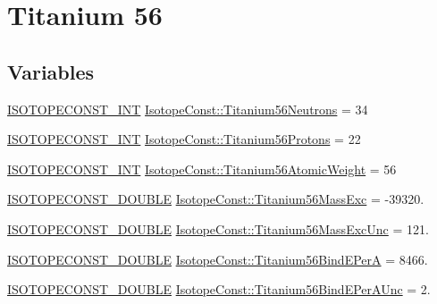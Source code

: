 \hypertarget{group___isotope_const-_titanium-_ti56}{}\section{Titanium 56}
\label{group___isotope_const-_titanium-_ti56}
\subsection*{Variables}
\begin{DoxyCompactItemize}
\item 
\mbox{\hyperlink{group___isotope_const-_macros_ga5f18360b3e99483a35c32d789e62621c}{I\+S\+O\+T\+O\+P\+E\+C\+O\+N\+S\+T\+\_\+\+I\+NT}} \mbox{\hyperlink{group___isotope_const-_titanium-_ti56_ga70e68827f6d0f960cc6df82e3f861377}{Isotope\+Const\+::\+Titanium56\+Neutrons}} = 34
\item 
\mbox{\hyperlink{group___isotope_const-_macros_ga5f18360b3e99483a35c32d789e62621c}{I\+S\+O\+T\+O\+P\+E\+C\+O\+N\+S\+T\+\_\+\+I\+NT}} \mbox{\hyperlink{group___isotope_const-_titanium-_ti56_ga25c76c976bf1a2342878a7973c083ddc}{Isotope\+Const\+::\+Titanium56\+Protons}} = 22
\item 
\mbox{\hyperlink{group___isotope_const-_macros_ga5f18360b3e99483a35c32d789e62621c}{I\+S\+O\+T\+O\+P\+E\+C\+O\+N\+S\+T\+\_\+\+I\+NT}} \mbox{\hyperlink{group___isotope_const-_titanium-_ti56_ga5f3f2dc4f95b49cd04205985a24712b4}{Isotope\+Const\+::\+Titanium56\+Atomic\+Weight}} = 56
\item 
\mbox{\hyperlink{group___isotope_const-_macros_ga8f45a7272ce02c0b4c65c44636ed719a}{I\+S\+O\+T\+O\+P\+E\+C\+O\+N\+S\+T\+\_\+\+D\+O\+U\+B\+LE}} \mbox{\hyperlink{group___isotope_const-_titanium-_ti56_ga93fc102713ad53987ba17346424a6d40}{Isotope\+Const\+::\+Titanium56\+Mass\+Exc}} = -\/39320.
\item 
\mbox{\hyperlink{group___isotope_const-_macros_ga8f45a7272ce02c0b4c65c44636ed719a}{I\+S\+O\+T\+O\+P\+E\+C\+O\+N\+S\+T\+\_\+\+D\+O\+U\+B\+LE}} \mbox{\hyperlink{group___isotope_const-_titanium-_ti56_ga1aa65fd412a17cbcca2728aa507063ce}{Isotope\+Const\+::\+Titanium56\+Mass\+Exc\+Unc}} = 121.
\item 
\mbox{\hyperlink{group___isotope_const-_macros_ga8f45a7272ce02c0b4c65c44636ed719a}{I\+S\+O\+T\+O\+P\+E\+C\+O\+N\+S\+T\+\_\+\+D\+O\+U\+B\+LE}} \mbox{\hyperlink{group___isotope_const-_titanium-_ti56_ga4bf607657f9a4f445578841f7f15b97c}{Isotope\+Const\+::\+Titanium56\+Bind\+E\+PerA}} = 8466.
\item 
\mbox{\hyperlink{group___isotope_const-_macros_ga8f45a7272ce02c0b4c65c44636ed719a}{I\+S\+O\+T\+O\+P\+E\+C\+O\+N\+S\+T\+\_\+\+D\+O\+U\+B\+LE}} \mbox{\hyperlink{group___isotope_const-_titanium-_ti56_ga1aeb8644b032509baad57d64fe2e71c0}{Isotope\+Const\+::\+Titanium56\+Bind\+E\+Per\+A\+Unc}} = 2.

\end{DoxyCompactItemize}
